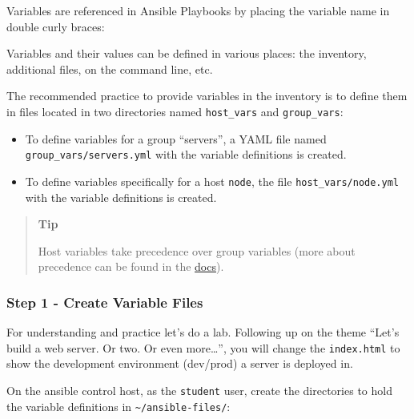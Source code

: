 Variables are referenced in Ansible Playbooks by placing the variable
name in double curly braces:

\begin{Shaded}
\begin{Highlighting}[]
\end{Highlighting}
\end{Shaded}

Variables and their values can be defined in various places: the
inventory, additional files, on the command line, etc.

The recommended practice to provide variables in the inventory is to
define them in files located in two directories named
\texttt{host\_vars} and \texttt{group\_vars}:

\begin{itemize}
\tightlist
\item
  To define variables for a group ``servers'', a YAML file named
  \texttt{group\_vars/servers.yml} with the variable definitions is
  created.
\item
  To define variables specifically for a host \texttt{node}, the file
  \texttt{host\_vars/node.yml} with the variable definitions is
  created.
\end{itemize}

\begin{quote}
\textbf{Tip}

Host variables take precedence over group variables (more about
precedence can be found in the
\href{https://docs.ansible.com/ansible/latest/user_guide/playbooks_variables.html\#variable-precedence-where-should-i-put-a-variable}{docs}).
\end{quote}

\hypertarget{step-1---create-variable-files}{%
\subsubsection{Step 1 - Create Variable
Files}\label{step-1---create-variable-files}}

For understanding and practice let's do a lab. Following up on the theme
``Let's build a web server. Or two. Or even more\ldots\hspace{0pt}'',
you will change the \texttt{index.html} to show the development
environment (dev/prod) a server is deployed in.

On the ansible control host, as the \texttt{student} user, create the
directories to hold the variable definitions in
\texttt{\textasciitilde{}/ansible-files/}:

